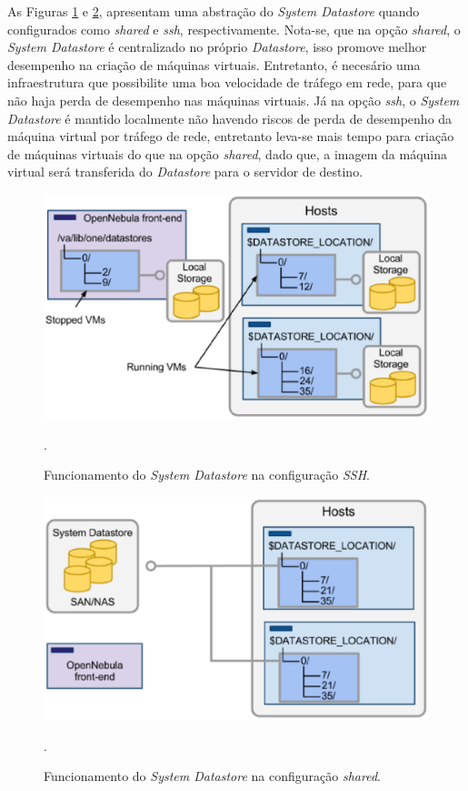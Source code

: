 As Figuras \ref{ssh_datastore} e \ref{shared_datastore}, apresentam uma abstração do \textit{System Datastore} quando configurados como \textit{shared} e \textit{ssh}, respectivamente. Nota-se, que na opção \textit{shared}, o \textit{System Datastore} é centralizado no próprio \textit{Datastore}, isso promove melhor desempenho na criação de máquinas virtuais. Entretanto, é necesário uma infraestrutura que possibilite uma boa velocidade de tráfego em rede, para que não haja perda de desempenho nas máquinas virtuais. Já na opção \textit{ssh}, o \textit{System Datastore} é mantido localmente não havendo riscos de perda de desempenho da máquina virtual por tráfego de rede, entretanto leva-se mais tempo para criação de máquinas virtuais do que na opção \textit{shared}, dado que, a imagem da máquina virtual será transferida do \textit{Datastore} para o servidor de destino.
\begin{figure}[!htb]
\centering
\includegraphics [keepaspectratio=true,scale=0.4]{figuras/ssh_datastore.eps}
\caption{Funcionamento do \textit{System Datastore} na configuração \textit{SSH}.}
\cite{opennebula}.
\label{ssh_datastore}
\end{figure}

\begin{figure}[!htb]
\centering
\includegraphics [keepaspectratio=true,scale=0.4]{figuras/shared_datastore.eps}
\caption{Funcionamento do \textit{System Datastore} na configuração \textit{shared}. }
\cite{opennebula}.
\label{shared_datastore}
\end{figure}

